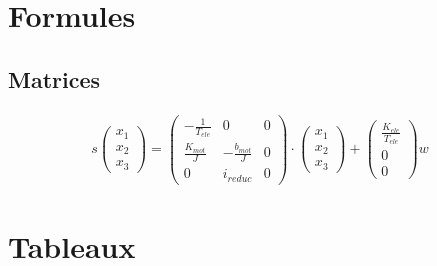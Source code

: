 \documentclass[a4paper, 12pt]{article}
\begin{document}
\section{Formules}
\subsection{Matrices}
\begin{align}
    s\begin{pmatrix}x_1\\x_2\\x_3\end{pmatrix} = 
    \begin{pmatrix}
        -\frac{1}{T_{ele}} & 0 & 0 \\
        \frac{K_{mot}}{J} & -\frac{b_{mot}}{J} & 0\\
        0 & i_{reduc} & 0 
    \end{pmatrix}
    \cdot
    \begin{pmatrix}
    x_1\\
    x_2\\
    x_3
    \end{pmatrix}
    +
    \begin{pmatrix}
        \frac{K_{ele}}{T_{ele}}\\
        0\\
        0
    \end{pmatrix}
    w
\end{align}
\newpage
\section{Tableaux}

\nocite{*} %
\printbibliography[title={Références}] %
\end{document}
